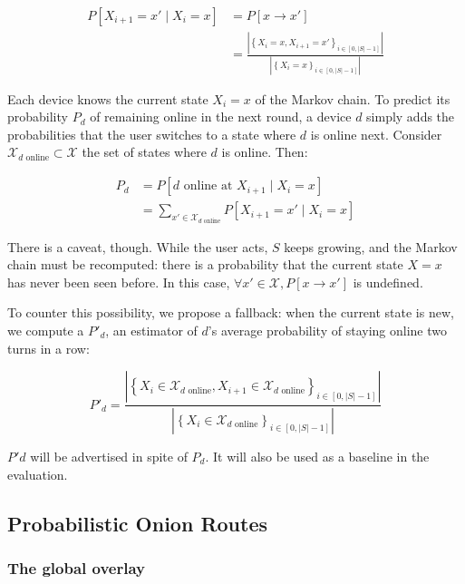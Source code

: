 \begin{align*}
P\left[X_{i+1}=x' \mid X_i=x \right] &= P\left[x \rightarrow x' \right] \\&= \frac{\left| \left\{ X_i = x, X_{i+1} = x' \right\}_{i \in \left[0, |S| - 1\right]} \right|}{\left| \left\{ X_i = x \right\}_{i \in \left[0, |S| - 1\right]} \right|}
\end{align*}

Each device knows the current state $X_i=x$ of the Markov chain.
To predict its probability $P_d$ of remaining online in the next round, 
a device $d$ simply adds the probabilities that the user switches to a state where $d$ is online next.
Consider $\mathcal{X}_{d\text{ online}} \subset \mathcal{X}$ the set of states where $d$ is online. Then:

\begin{align*}
P_d & = P\left[d\text{ online at }X_{i+1} \mid X_i=x\right] \\ & = \sum\limits_{x' \in \mathcal{X}_{d\text{ online}}} P\left[ X_{i+1}=x' \mid X_i=x \right]
\end{align*}

There is a caveat, though.
While the user acts, $S$ keeps growing, and the Markov chain must be recomputed: there is a probability that the current state $X=x$ has never been seen before.
In this case, $\forall x' \in \mathcal{X}, P\left[x \rightarrow x'\right]$ is undefined.

To counter this possibility, we propose a fallback:
when the current state is new, we compute a $P'_d$, an estimator of $d$'s average probability of staying online two turns in a row:

$$ P'_d = \frac{\left| \left\{ X_i \in \mathcal{X}_{d\text{ online}}, X_{i+1} \in \mathcal{X}_{d\text{ online}} \right\}_{i \in \left[0, |S| - 1\right]} \right|}{\left| \left\{ X_i \in \mathcal{X}_{d\text{ online}} \right\}_{i \in \left[0, |S| - 1\right]} \right|} $$

$P'd$ will be advertised in spite of $P_d$. It will also be used as a baseline in the evaluation.

\subsection{Probabilistic Onion Routes}
\label{ssec:por}

\subsubsection{The global overlay}
\label{sssec:global_overlay}

